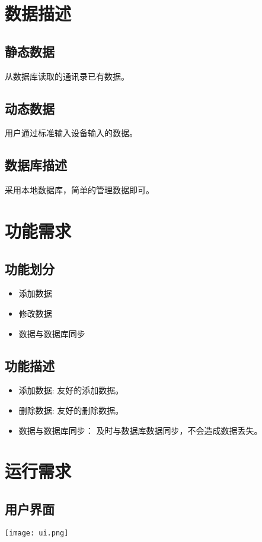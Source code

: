 \section{数据描述}
	\subsection{静态数据}
		从数据库读取的通讯录已有数据。
	\subsection{动态数据}
		用户通过标准输入设备输入的数据。
	\subsection{数据库描述}
		采用本地数据库，简单的管理数据即可。
\section{功能需求}
	\subsection{功能划分}
		\begin{itemize}
			\item 添加数据
			\item 修改数据
			\item 数据与数据库同步
		\end{itemize}
	\subsection{功能描述}
		\begin{itemize}
			\item 添加数据: 友好的添加数据。
			\item 删除数据: 友好的删除数据。
			\item 数据与数据库同步： 及时与数据库数据同步，不会造成数据丢失。
		\end{itemize}
\section{运行需求}
	\subsection{用户界面}
		\texttt{[image: ui.png]}
